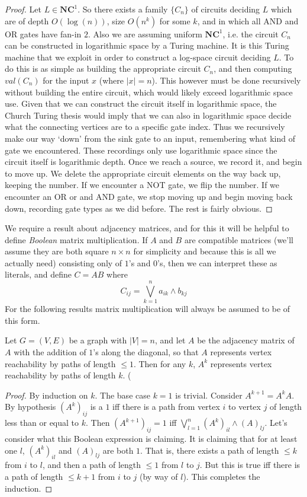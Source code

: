 \begin{proof}
	Let $L \in \bm{NC}^1$. So there exists a family $\{C_n\}$ of circuits deciding $L$ which are of depth $O(\log(n))$, size $O(n^k)$ for some $k$, and in which all AND and OR gates have fan-in $2$. Also we are assuming uniform $\bm{NC}^1$, i.e. the circuit $C_n$ can be constructed in logarithmic space by a Turing machine. It is this Turing machine that we exploit in order to construct a log-space circuit deciding $L$. To do this is as simple as building the appropriate circuit $C_n$, and then computing $val(C_n)$ for the input $x$ (where $|x| = n$). This however must be done recursively without building the entire circuit, which would likely exceed logarithmic space use. Given that we can construct the circuit itself in logarithmic space, the Church Turing thesis would imply that we can also in logarithmic space decide what the connecting vertices are to a specific gate index. Thus we recursively make our way `down' from the sink gate to an input, remembering what kind of gate we encountered. These recordings only use logarithmic space since the circuit itself is logarithmic depth. Once we reach a source, we record it, and begin to move up. We delete the appropriate circuit elements on the way back up, keeping the number. If we encounter a NOT gate, we flip the number. If we encounter an OR or and AND gate, we stop moving up and begin moving back down, recording gate types as we did before. The rest is fairly obvious. 
\end{proof}
We require a result about adjacency matrices, and for this it will be helpful to define \emph{Boolean} matrix multiplication. If $A$ and $B$ are compatible matrices (we'll assume they are both square $n \times n$ for simplicity and because this is all we actually need) consisting only of $1$'s and $0$'s, then we can interpret these as literals, and define $C = AB$ where 
\[ C_{ij} = \bigvee_{k=1}^n a_{ik} \wedge b_{kj} \] 
For the following results matrix multiplication will always be assumed to be of this form.
\begin{lemma}
	Let $G = (V,E)$ be a graph with $|V| = n$, and let $A$ be the adjacency matrix of $A$ with the addition of $1$'s along the diagonal, so that $A$ represents vertex reachability by paths of length $\leq 1$. Then for any $k$, $A^k$ represents vertex reachability by paths of length $k$. (
\end{lemma}
\begin{proof}
	By induction on $k$. The base case $k=1$ is trivial. Consider $A^{k+1} = A^kA$. By hypothesis $(A^k)_{ij}$ is a $1$ iff there is a path from vertex $i$ to vertex $j$ of length less than or equal to $k$. Then $(A^{k+1})_{ij} = 1$ iff $\bigvee_{l=1}^n (A^k)_{il} \wedge (A)_{lj}$. Let's consider what this Boolean expression is claiming. It is claiming that for at least one $l$, $(A^k)_{il}$ and $(A)_{lj}$ are both $1$. That is, there exists a path of length $\leq k$ from $i$ to $l$, and then a path of length $\leq 1$ from $l$ to $j$. But this is true iff there is a path of length $\leq k+1$ from $i$ to $j$ (by way of $l$). This completes the induction. 
\end{proof}
